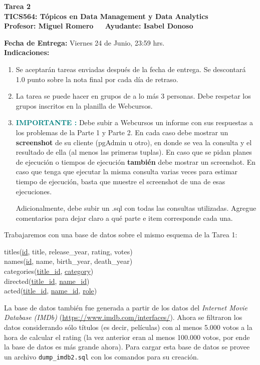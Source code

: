 \documentclass[11pt,a4paper]{article}
\begin{document}

\medskip

\begin{center}
\Large{{\bf Tarea 2}}\\
\large{{\bf TICS564: Tópicos en Data Management y Data Analytics}}\\
\small{{\bf Profesor: Miguel Romero} $\quad$ {\bf Ayudante: Isabel Donoso}}
\end{center}


\noindent
{\bf Fecha de Entrega:} Viernes 24 de Junio, 23:59 hrs.\\

\noindent
{\bf Indicaciones:}
\begin{enumerate}
\item Se aceptar\'an tareas enviadas después de la fecha de entrega. Se descontar\'a 1.0 punto sobre la nota final por cada d\'ia de retraso. 
\item La tarea se puede hacer en grupos de a lo más 3 personas. Debe respetar los grupos inscritos en la planilla de Webcursos.
\item \textcolor{teal}{{\bf IMPORTANTE :}} Debe subir a Webcursos un informe con sus respuestas a los problemas de la Parte 1 y Parte 2. 
En cada caso debe mostrar un {\bf screenshot} de su cliente (pgAdmin u otro), en donde se vea la consulta y el resultado de ella (al menos las primeras tuplas). En caso que se pidan planes de ejecución o tiempos de ejecución {\bf también} debe mostrar un screenshot. En caso que tenga que ejecutar 
la misma consulta varias veces para estimar tiempo de ejecución, basta que muestre el screenshot de una de esas ejecuciones. 

Adicionalmente, debe subir un .sql con todas las consultas utilizadas. Agregue comentarios para dejar claro a qué parte e item corresponde cada una. \end{enumerate} 

\medskip

Trabajaremos con una base de datos sobre el mismo esquema de la Tarea 1:
\begin{center}
titles(\underline{id}, title, release\_year, rating, votes)\\
names(\underline{id}, name, birth\_year, death\_year)\\
categories(\underline{title\_id}, \underline{category})\\
directed(\underline{title\_id}, \underline{name\_id})\\
acted(\underline{title\_id}, \underline{name\_id}, \underline{role})
\end{center}
La base de datos también fue generada a partir de los datos del \emph{Internet Movie Database (IMDb)} (\href{https://www.imdb.com/interfaces/}{https://www.imdb.com/interfaces/}). Ahora se filtraron los datos considerando sólo títulos (es decir, películas) con al menos 5.000 votos a la hora de calcular el rating (la vez anterior eran al menos 100.000 votos, por ende la base de datos es más grande ahora). Para cargar esta base de datos se provee un archivo {\tt dump\_imdb2.sql} con los comandos para su creación. 
\end{document}
